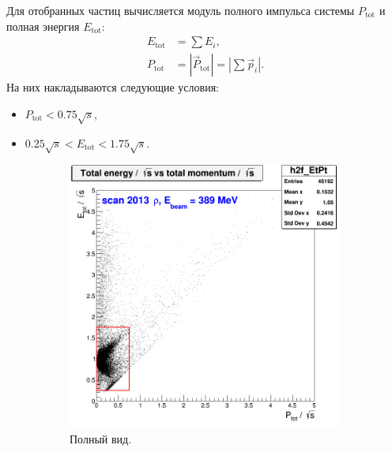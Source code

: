 Для отобранных частиц вычисляется модуль полного импульса системы $P_{\text{tot}}$ и полная энергия $E_{\text{tot}}$:
\begin{align}
    E_{\text{tot}} &= \sum E_i , \\
    P_{\text{tot}} &= \left| \vec{P}_{\text{tot}} \right| = \left| \sum \vec{p}_i \right| .
\end{align}
На них накладываются следующие условия:
\begin{itemize}
    \item $P_{\text{tot}} < 0.75 \sqrt{s}$,
    \item $0.25 \sqrt{s} < E_{\text{tot}} < 1.75 \sqrt{s}$.
\end{itemize}
\begin{figure}[htbp]
    \centering
    \begin{subfigure}[b]{0.45\textwidth}
        \includegraphics[width=\textwidth]{img/h2f_EtPt.png}
        \caption{Полный вид.}\label{fig:3pi_EtPt_full}
    \end{subfigure}
    ~
    \begin{subfigure}[b]{0.45\textwidth}

\end{subfigure}
\end{figure}
